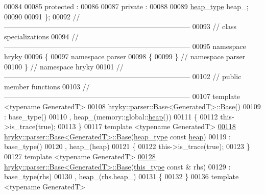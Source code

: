 \begin{DoxyCode}
00084 
00085 \textcolor{keyword}{protected} :
00086 
00087 \textcolor{keyword}{private} :
00088 
00089     \hyperlink{classhryky_1_1memory_1_1heap_1_1_base}{heap_type} heap\_;
00090 
00091 \};
00092 \textcolor{comment}{//
      ------------------------------------------------------------------------------}
00093 \textcolor{comment}{// class specializations}
00094 \textcolor{comment}{//
      ------------------------------------------------------------------------------}
00095 \textcolor{keyword}{namespace }hryky
00096 \{
00097 \textcolor{keyword}{namespace }parser
00098 \{
00099 \} \textcolor{comment}{// namespace parser}
00100 \} \textcolor{comment}{// namespace hryky}
00101 \textcolor{comment}{//
      ------------------------------------------------------------------------------}
00102 \textcolor{comment}{// public member functions}
00103 \textcolor{comment}{//
      ------------------------------------------------------------------------------}
00107 \textcolor{comment}{}\textcolor{keyword}{template} <\textcolor{keyword}{typename} GeneratedT>
\hypertarget{parser__base_8h_source_l00108}{}\hyperlink{classhryky_1_1parser_1_1_base_a5ffe0568374d8b9b4c4ec32953fd6453}{00108} \hyperlink{classhryky_1_1parser_1_1_base_a5ffe0568374d8b9b4c4ec32953fd6453}{hryky::parser::Base<GeneratedT>::Base}()
00109     : base\_type()
00110       , heap\_(memory::global::\hyperlink{namespacehryky_1_1memory_1_1global_a6fc6103f67c837aa0f39b359588409cd}{heap}())
00111 \{
00112     this->is\_trace(\textcolor{keyword}{true});
00113 \}
00117 \textcolor{keyword}{template} <\textcolor{keyword}{typename} GeneratedT>
\hypertarget{parser__base_8h_source_l00118}{}\hyperlink{classhryky_1_1parser_1_1_base_ae4a18c6bd5f5f323df696bbed4aa6b97}{00118} \hyperlink{classhryky_1_1parser_1_1_base}{hryky::parser::Base<GeneratedT>::Base}(\hyperlink{classhryky_1_1memory_1_1heap_1_1_base}{heap_type} \textcolor{keyword}{const} \hyperlink{namespacehryky_1_1memory_1_1global_a6fc6103f67c837aa0f39b359588409cd}{heap})
00119     : base\_type()
00120       , heap\_(heap)
00121 \{
00122     this->is\_trace(\textcolor{keyword}{true});
00123 \}
00127 \textcolor{keyword}{template} <\textcolor{keyword}{typename} GeneratedT>
\hypertarget{parser__base_8h_source_l00128}{}\hyperlink{classhryky_1_1parser_1_1_base_a663fa22bf8197e0acf1adc4ff4f74cd8}{00128} \hyperlink{classhryky_1_1parser_1_1_base}{hryky::parser::Base<GeneratedT>::Base}(\hyperlink{classhryky_1_1parser_1_1_base}{this_type} \textcolor{keyword}{const} & rhs)
00129     : base\_type(rhs)
00130       , heap\_(rhs.heap\_)
00131 \{
00132 \}
00136 \textcolor{keyword}{template} <\textcolor{keyword}{typename} GeneratedT>

\end{DoxyCode}
